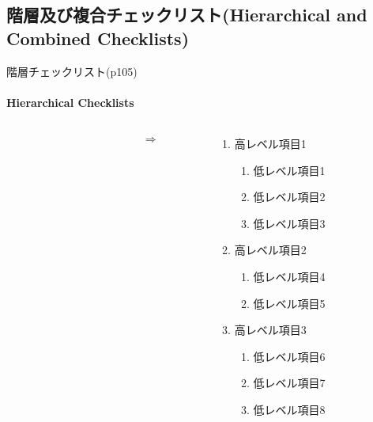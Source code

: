 \subsection{階層及び複合チェックリスト(Hierarchical and Combined Checklists)}
\begin{frame}{階層チェックリスト(p105)}
\framesubtitle{Hierarchical Checklists }
\begin{columns}
    \begin{column}{0.35\textwidth}
    \end{column}
    \begin{column}{0.05\textwidth}
    \Huge\[\Rightarrow\]
    \end{column}
    \begin{column}{0.5\textwidth}
    \begin{enumerate}
    \item 高レベル項目1
        \begin{enumerate}
        \item 低レベル項目1
        \item 低レベル項目2
        \item 低レベル項目3
        \end{enumerate}
    \item 高レベル項目2
        \begin{enumerate}
        \item 低レベル項目4
        \item 低レベル項目5
        \end{enumerate}
    \item 高レベル項目3
        \begin{enumerate}
        \item 低レベル項目6
        \item 低レベル項目7
        \item 低レベル項目8
        \end{enumerate}
    \end{enumerate}
    \end{column}
\end{columns}
\end{frame}
